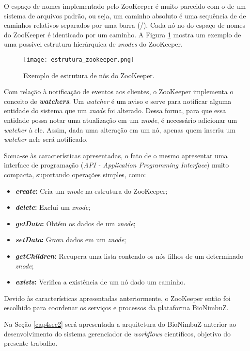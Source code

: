 O espaço de nomes implementado pelo ZooKeeper é muito parecido com o de um sistema de arquivos padrão, ou seja, um caminho absoluto é uma sequência de de caminhos relativos separados por uma barra (/). Cada nó no do espaço de nomes do ZooKeeper é identicado por um caminho. A Figura \ref{fig:estrutura_zookeeper} mostra um exemplo de uma possível estrutura hierárquica de \textit{znodes} do ZooKeeper.

\begin{figure}[H]
	\centering
	\texttt{[image: estrutura\_zookeeper.png]}
	\caption{Exemplo de estrutura de nós do ZooKeeper.}
	\label{fig:estrutura_zookeeper}
\end{figure}

Com relação à notificação de eventos aos clientes, o ZooKeeper implementa o conceito de \textbf{\textit{watchers}}. Um \textit{watcher} é um aviso e serve para notificar alguma entidade do sistema que um \textit{znode} foi alterado. Dessa forma, para que essa entidade possa notar uma atualização em um \textit{znode}, é necessário adicionar um \textit{watcher} à ele. Assim, dada uma alteração em um nó, apenas quem inseriu um \textit{watcher} nele será notificado.

Soma-se às características apresentadas, o fato de o mesmo apresentar uma interface de programação (\textit{API - Application Programming Interface}) muito compacta, suportando operações simples, como:

\begin{itemize}
	\item \textbf{\textit{create}:} Cria um \textit{znode} na estrutura do ZooKeeper;
    \item \textbf{\textit{delete}:} Exclui um \textit{znode};
    \item \textbf{\textit{getData}:} Obtém os dados de um \textit{znode};
    \item \textbf{\textit{setData}:} Grava dados em um \textit{znode};
    \item \textbf{\textit{getChildren}:} Recupera uma lista contendo os nós filhos de um determinado \textit{znode};
    \item \textbf{\textit{exists}:} Verifica a existência de um nó dado um caminho.
\end{itemize}

Devido às características apresentadas anteriormente, o ZooKeeper então foi escolhido para coordenar os serviços e processos da plataforma BioNimbuZ.

Na Seção \ref{cap4sec2} será apresentada a arquitetura do BioNimbuZ anterior ao desenvolvimento do sistema gerenciador de \textit{workflows} científicos, objetivo do presente trabalho.


